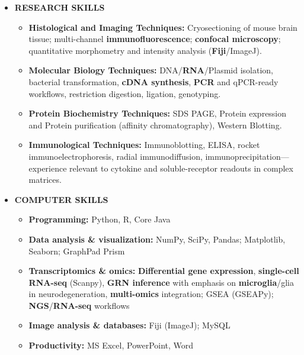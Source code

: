 \documentclass[letterpaper,11pt]{article}
\newcommand{\jobhl}[1]{\textbf{\color{accent-teal}#1}}
\begin{document}
\begin{itemize}[leftmargin=0.15in, itemsep=2pt]
  \item \small \textbf{RESEARCH SKILLS}
  \begin{itemize}[leftmargin=0.22in, label=$\vcenter{\hbox{\tiny$\bullet$}}$, itemsep=1pt, topsep=2pt, parsep=0pt]
    \item \small \textbf{Histological and Imaging Techniques:} Cryosectioning of mouse brain tissue; multi-channel \jobhl{immunofluorescence}; \jobhl{confocal microscopy}; quantitative morphometry and intensity analysis (\jobhl{Fiji}/ImageJ).
    \item \small \textbf{Molecular Biology Techniques:} DNA/\jobhl{RNA}/Plasmid isolation, bacterial transformation, \jobhl{cDNA synthesis}, \jobhl{PCR} and qPCR-ready workflows, restriction digestion, ligation, genotyping.
    \item \small \textbf{Protein Biochemistry Techniques:} SDS PAGE, Protein expression and Protein purification (affinity chromatography), Western Blotting.
    \item \small \textbf{Immunological Techniques:} Immunoblotting, ELISA, rocket immunoelectrophoresis, radial immunodiffusion, immunoprecipitation---experience relevant to cytokine and soluble-receptor readouts in complex matrices.
  \end{itemize}
  \item \small \textbf{COMPUTER SKILLS}
  \begin{itemize}[leftmargin=0.22in, label=$\vcenter{\hbox{\tiny$\bullet$}}$, itemsep=1pt, topsep=2pt, parsep=0pt]
    \item \small \textbf{Programming:} Python, R, Core Java
    \item \small \textbf{Data analysis \& visualization:} NumPy, SciPy, Pandas; Matplotlib, Seaborn; GraphPad Prism
    \item \small \textbf{Transcriptomics \& omics:} \jobhl{Differential gene expression}, \jobhl{single-cell RNA-seq} (Scanpy), \jobhl{GRN inference} with emphasis on \jobhl{microglia}/glia in neurodegeneration, \jobhl{multi-omics} integration; GSEA (GSEAPy); \jobhl{NGS}/\jobhl{RNA-seq} workflows
    \item \small \textbf{Image analysis \& databases:} Fiji (ImageJ); MySQL
    \item \small \textbf{Productivity:} MS Excel, PowerPoint, Word
  \end{itemize}
\end{itemize}
\vspace{-2mm}
\end{document}

